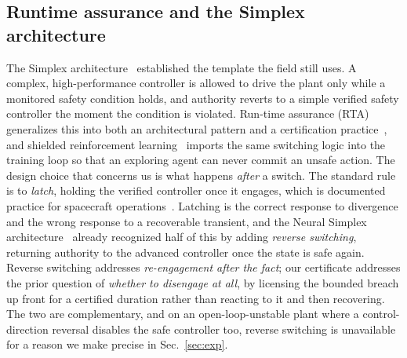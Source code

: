 \documentclass[journal]{IEEEtran}
\theoremstyle{plain}
\theoremstyle{definition}
\begin{document}
\subsection{Runtime assurance and the Simplex architecture} The Simplex
architecture~\cite{Sha2001} established the template the field still uses. A complex,
high-performance controller is allowed to drive the plant only while a monitored safety
condition holds, and authority reverts to a simple verified safety controller the moment the
condition is violated. Run-time assurance (RTA) generalizes this into both an architectural
pattern and a certification practice~\cite{Hook2016,ASTMF3269}, and shielded reinforcement
learning~\cite{Alshiekh2018} imports the same switching logic into the training loop so that
an exploring agent can never commit an unsafe action. The design choice that concerns us is
what happens \emph{after} a switch. The standard rule is to \emph{latch}, holding the
verified controller once it engages, which is documented practice for spacecraft
operations~\cite{Dunlap2022}. Latching is the correct response to divergence and the wrong
response to a recoverable transient, and the Neural Simplex architecture~\cite{Phan2020}
already recognized half of this by adding \emph{reverse switching}, returning authority to
the advanced controller once the state is safe again. Reverse switching addresses
\emph{re-engagement after the fact}; our certificate addresses the prior question of
\emph{whether to disengage at all}, by licensing the bounded breach up front for a certified
duration rather than reacting to it and then recovering. The two are complementary, and on an
open-loop-unstable plant where a control-direction reversal disables the safe controller too,
reverse switching is unavailable for a reason we make precise in Sec.~\ref{sec:exp}.
\end{document}

